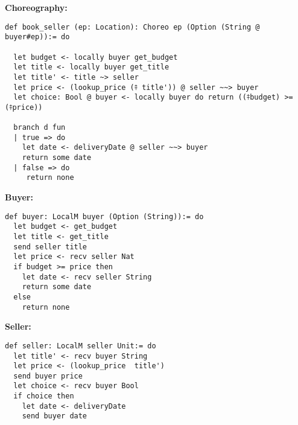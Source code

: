 \textbf{Choreography:}
\begin{lstlisting}[label={lst:buyer_seller_chor},language=lean]
def book_seller (ep: Location): Choreo ep (Option (String @ buyer#ep)):= do

  let budget <- locally buyer get_budget
  let title <- locally buyer get_title
  let title' <- title ~> seller
  let price <- (lookup_price (⤉ title')) @ seller ~~> buyer
  let choice: Bool @ buyer <- locally buyer do return ((⤉budget) >= (⤉price))

  branch d fun
  | true => do
    let date <- deliveryDate @ seller ~~> buyer
    return some date
  | false => do
     return none
\end{lstlisting}
\noindent
\begin{minipage}{.5\textwidth}
\textbf{Buyer:}

\begin{lstlisting}[label={lst:buyer_ep}, language=lean, basicstyle=\small]
def buyer: LocalM buyer (Option (String)):= do
  let budget <- get_budget
  let title <- get_title
  send seller title
  let price <- recv seller Nat
  if budget >= price then
    let date <- recv seller String
    return some date
  else
    return none
\end{lstlisting}
\end{minipage}
\begin{minipage}{.5\textwidth}
\textbf{Seller:}
\begin{lstlisting}[label={lst:seller_ep},language=lean, basicstyle=\small]
def seller: LocalM seller Unit:= do
  let title' <- recv buyer String
  let price <- (lookup_price  title')
  send buyer price
  let choice <- recv buyer Bool
  if choice then
    let date <- deliveryDate
    send buyer date
\end{lstlisting}
\end{minipage}
